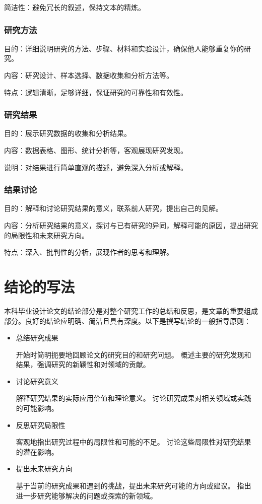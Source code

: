 简洁性：避免冗长的叙述，保持文本的精炼。
\subsubsection{研究方法}    %
目的：详细说明研究的方法、步骤、材料和实验设计，确保他人能够重复你的研究。

内容：研究设计、样本选择、数据收集和分析方法等。

特点：逻辑清晰，足够详细，保证研究的可靠性和有效性。

\subsubsection{研究结果}
目的：展示研究数据的收集和分析结果。

内容：数据表格、图形、统计分析等，客观展现研究发现。

说明：对结果进行简单直观的描述，避免深入分析或解释。

\subsubsection{结果讨论}
目的：解释和讨论研究结果的意义，联系前人研究，提出自己的见解。

内容：分析研究结果的意义，探讨与已有研究的异同，解释可能的原因，提出研究的局限性和未来研究方向。

特点：深入、批判性的分析，展现作者的思考和理解。


\section{结论的写法}

本科毕业设计论文的结论部分是对整个研究工作的总结和反思，是文章的重要组成部分。良好的结论应明确、简洁且具有深度。以下是撰写结论的一般指导原则：

\begin{itemize}         %
\item 总结研究成果

开始时简明扼要地回顾论文的研究目的和研究问题。
概述主要的研究发现和结果，强调研究的新颖性和对领域的贡献。

\item 讨论研究意义

解释研究结果的实际应用价值和理论意义。
讨论研究成果对相关领域或实践的可能影响。

\item 反思研究局限性

客观地指出研究过程中的局限性和可能的不足。
讨论这些局限性对研究结果的潜在影响。

\item 提出未来研究方向

基于当前的研究成果和遇到的挑战，提出未来研究可能的方向或建议。
指出进一步研究能够解决的问题或探索的新领域。
\end{itemize}


